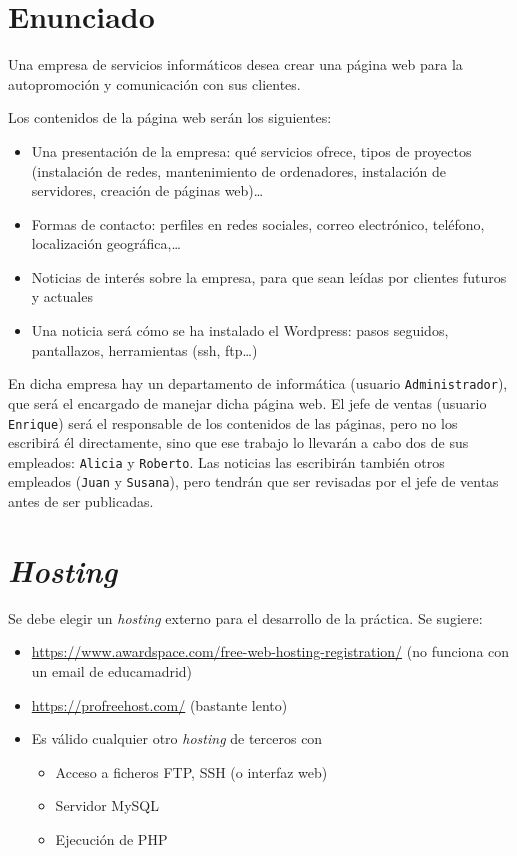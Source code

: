 \documentclass[a4paper]{article}
\begin{document}
\section{Enunciado}
\label{sec:org0000003}
Una empresa de servicios informáticos desea crear una página web para la autopromoción y  comunicación con sus clientes.

Los contenidos de la página web serán los siguientes:
\begin{itemize}
\item Una presentación de la empresa: qué servicios ofrece, tipos de proyectos (instalación de redes, mantenimiento de ordenadores, instalación de servidores, creación de páginas web)\ldots{}
\item Formas de contacto: perfiles en redes sociales, correo electrónico, teléfono, localización geográfica,\ldots{}
\item Noticias de interés sobre la empresa, para que sean leídas por clientes futuros y actuales
\item Una noticia será cómo se ha instalado el Wordpress: pasos seguidos, pantallazos, herramientas (ssh, ftp\ldots{})
\end{itemize}

En dicha empresa hay un departamento de informática (usuario \texttt{Administrador}), que será el encargado de manejar dicha página web. El jefe de ventas (usuario \texttt{Enrique}) será el responsable de los contenidos de las páginas, pero no los escribirá él directamente, sino que ese trabajo lo llevarán a cabo dos de sus empleados: \texttt{Alicia} y \texttt{Roberto}. Las noticias las escribirán también otros empleados (\texttt{Juan} y \texttt{Susana}), pero tendrán que ser revisadas por el jefe de ventas antes de ser publicadas.
\section{\emph{Hosting}}
\label{sec:org0000006}
Se debe elegir un \emph{hosting} externo para el desarrollo de la práctica. Se sugiere:
\begin{itemize}
\item \url{https://www.awardspace.com/free-web-hosting-registration/}   (no funciona con un email de educamadrid)
\item \url{https://profreehost.com/} (bastante lento)
\item Es válido cualquier otro \emph{hosting} de terceros con
\begin{itemize}
\item Acceso a ficheros FTP, SSH (o interfaz web)
\item Servidor MySQL
\item Ejecución de PHP
\end{itemize}
\end{itemize}
\end{document}
